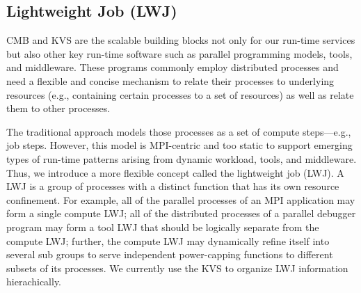\subsection{Lightweight Job (LWJ)}
CMB and KVS are the scalable building blocks not only for our run-time services 
but also other key run-time software such as parallel programming models, 
tools, and middleware. These programs commonly employ distributed processes and need a 
flexible and concise mechanism to relate their processes to underlying resources 
(e.g., containing certain processes to a set of resources) as well as relate 
them to other processes. 

The traditional approach models those processes as
a set of compute steps---e.g., job steps. However, this model 
is MPI-centric and too static to support emerging types
of run-time patterns arising from dynamic workload, tools, and middleware.
Thus, we introduce a more flexible concept called the lightweight job (LWJ).
A LWJ is a group
of processes with a distinct function that has its own resource confinement. 
For example, all of the parallel
processes of an MPI application may form a single compute LWJ; all of the distributed processes
of a parallel debugger program may form a tool LWJ that should be logically separate from the
compute LWJ; further, the compute LWJ may dynamically refine itself into several 
sub groups to serve independent power-capping functions to different subsets of its processes.
We currently use the KVS to organize LWJ information hierachically.
